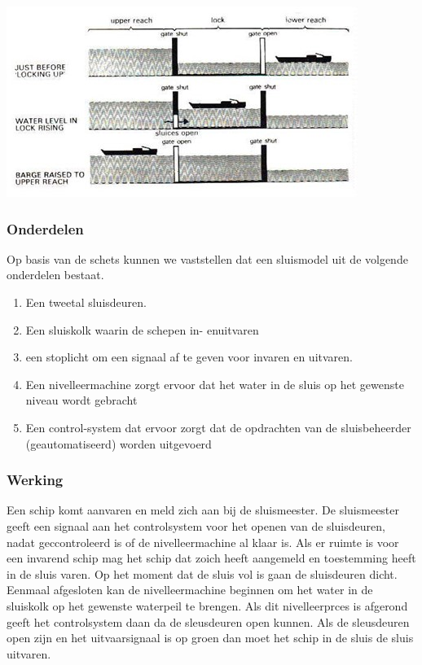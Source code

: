 \includegraphics[scale=0.65]{sluismodel.jpg}

\subsubsection{Onderdelen}
Op basis van de schets kunnen we vaststellen dat een sluismodel uit de volgende onderdelen bestaat.

\begin{enumerate}
	\item Een tweetal sluisdeuren. 
	\item Een sluiskolk waarin de schepen in- enuitvaren
	\item een stoplicht om een signaal af te geven voor invaren en uitvaren.
	\item Een nivelleermachine zorgt ervoor dat het water in de sluis op het gewenste niveau wordt gebracht
	\item Een control-system dat ervoor zorgt dat de opdrachten van de sluisbeheerder (geautomatiseerd) worden uitgevoerd
\end{enumerate}
\subsubsection{Werking}

Een schip komt aanvaren en meld zich aan bij de sluismeester. De sluismeester geeft een signaal aan het controlsystem voor het openen van de sluisdeuren, nadat geccontroleerd is of de nivelleermachine al klaar is. Als er ruimte is voor een invarend schip mag het schip dat zoich heeft aangemeld en toestemming heeft  in de sluis varen. Op het moment dat de sluis vol is gaan de sluisdeuren dicht. Eenmaal afgesloten kan de nivelleermachine beginnen om het water in de sluiskolk op het gewenste waterpeil te brengen. Als dit nivelleerprces is afgerond geeft  het controlsystem daan da de sleusdeuren open kunnen.  Als de sleusdeuren open zijn en het uitvaarsignaal is op groen dan moet het schip in de sluis de sluis uitvaren.
